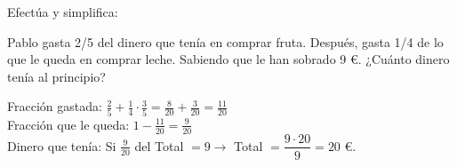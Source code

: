 \documentclass[addpoints,spanish, 12pt,a4paper]{exam}
\begin{document}
\begin{questions}

\question Efectúa y simplifica:
\noaddpoints %

\question[1] Pablo gasta 2/5 del dinero que tenía en comprar fruta. Después, gasta 1/4 de lo que le queda en comprar leche. Sabiendo que le han sobrado 9 \euro. ¿Cuánto dinero tenía al principio?
\begin{solution} Fracción gastada: $\frac{2}{5}+\frac{1}{4}\cdot\frac{3}{5}=\frac{8}{20}+\frac{3}{20}=\frac{11}{20}$  \\
Fracción que le queda: $1-\frac{11}{20}=\frac{9}{20}$ \\
Dinero que tenía: Si $\frac{9}{20}$ del Total $= 9\to$ Total $=\dfrac{9\cdot20}{9}=20$ \euro. \end{solution}


\end{questions}
\end{document}
